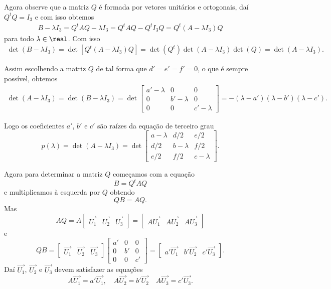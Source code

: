 Agora observe que a matriz $Q$ é formada por vetores unitários e ortogonais, daí $Q^tQ = I_3$ e com isso obtemos
\begin{align*}
  B - \lambda I_3 = Q^t A Q - \lambda I_3 = Q^t A Q - Q^t I_3 Q = Q^t (A - \lambda I_3)Q
\end{align*}
para todo $\lambda \in \real$. Com isso
\begin{align*}
  \det(B - \lambda I_3) = \det[Q^t(A - \lambda I_3)Q] = \det(Q^t)\det(A - \lambda I_3)\det(Q) = \det(A - \lambda I_3).
\end{align*}

Assim escolhendo a matriz $Q$ de tal forma que $d' = e' = f' = 0$, o que é sempre possível, obtemos
\begin{align*}
  \det(A - \lambda I_3) = \det(B - \lambda I_3) = \det \begin{bmatrix}
    a' - \lambda & 0 & 0\\
    0 & b' - \lambda & 0\\
    0 & 0 & c' - \lambda
  \end{bmatrix} = -(\lambda - a')(\lambda - b')(\lambda - c').
\end{align*}

Logo os coeficientes $a'$, $b'$ e $c'$ são raízes da equação de terceiro grau
\begin{equation}
  p(\lambda) = \det(A - \lambda I_3) = \det \begin{bmatrix}
    a - \lambda & d/2 & e/2\\
    d/2 & b - \lambda & f/2\\
    e/2 & f/2 & c - \lambda
  \end{bmatrix}.
\end{equation}

Agora para determinar a matriz $Q$ começamos com a equação
\[
  B = Q^t A Q
\]
e multiplicamos \`a esquerda por $Q$ obtendo
\[
  Q B = AQ.
\]
Mas
\[
	AQ = A \begin{bmatrix}
		\vec{U_1} & \vec{U_2} & \vec{U_3}
	\end{bmatrix} = \begin{bmatrix}
		A\vec{U_1} & A\vec{U_2} & A\vec{U_3}
	\end{bmatrix}
\]
e
\[
	QB = \begin{bmatrix}
		\vec{U_1} & \vec{U_2} & \vec{U_3}
	\end{bmatrix}\begin{bmatrix}
		a' & 0 & 0\\
		0 & b' & 0\\
		0 & 0 & c'
	\end{bmatrix} = \begin{bmatrix}
		a'\vec{U_1} & b'\vec{U_2} & c'\vec{U_3}
	\end{bmatrix}.
\]
Daí $\vec{U_1}$, $\vec{U_2}$ e $\vec{U_3}$ devem satisfazer as equações
\[
	A\vec{U_1} = a'\vec{U_1},\quad A\vec{U_2} = b'\vec{U_2} \quad A\vec{U_3} = c'\vec{U_3}.
\]

